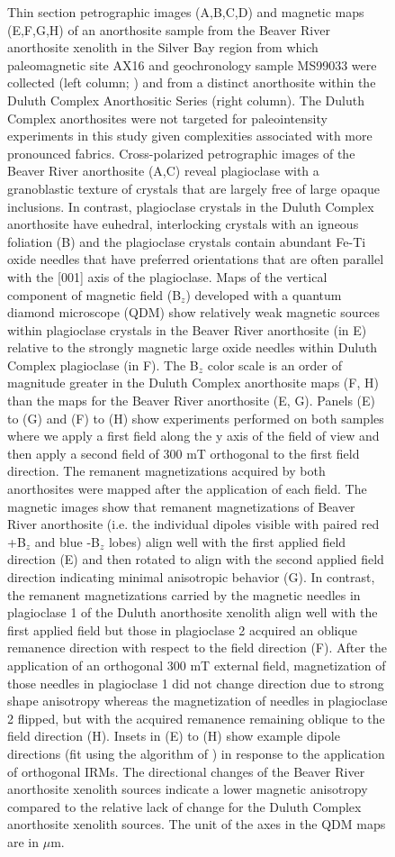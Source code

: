\documentclass[9pt,twocolumn,twoside,lineno]{pnas-new}
\begin{document}
\begin{figure}
\caption{\footnotesize{Thin section petrographic images (A,B,C,D) and magnetic maps (E,F,G,H) of an anorthosite sample from the Beaver River anorthosite xenolith in the Silver Bay region from which paleomagnetic site AX16 and geochronology sample MS99033 were collected (left column;  \citealp{Zhang2021b}) and from a distinct anorthosite within the Duluth Complex Anorthositic Series (right column). The Duluth Complex anorthosites were not targeted for paleointensity experiments in this study given complexities associated with more pronounced fabrics. Cross-polarized petrographic images of the Beaver River anorthosite (A,C) reveal plagioclase with a granoblastic texture of crystals that are largely free of large opaque inclusions. In contrast, plagioclase crystals in the Duluth Complex anorthosite have euhedral, interlocking crystals with an igneous foliation (B) and the plagioclase crystals contain abundant Fe-Ti oxide needles that have preferred orientations that are often parallel with the [001] axis of the plagioclase. Maps of the vertical component of magnetic field (B$_z$) developed with a quantum diamond microscope (QDM) show relatively weak magnetic sources within plagioclase crystals in the Beaver River anorthosite (in E) relative to the strongly magnetic large oxide needles within Duluth Complex plagioclase (in F). The B$_z$ color scale is an order of magnitude greater in the Duluth Complex anorthosite maps (F, H) than the maps for the Beaver River anorthosite (E, G). Panels (E) to (G) and (F) to (H) show experiments performed on both samples where we apply a first field along the y axis of the field of view and then apply a second field of 300 mT orthogonal to the first field direction. The remanent magnetizations acquired by both anorthosites were mapped after the application of each field. The magnetic images show that remanent magnetizations of Beaver River anorthosite (i.e. the individual dipoles visible with paired red +B$_z$ and blue -B$_z$ lobes) align well with the first applied field direction (E) and then rotated to align with the second applied field direction indicating minimal anisotropic behavior (G). In contrast, the remanent magnetizations carried by the magnetic needles in plagioclase 1 of the Duluth anorthosite xenolith align well with the first applied field but those in plagioclase 2 acquired an oblique remanence direction with respect to the field direction (F). After the application of an orthogonal 300 mT external field, magnetization of those needles in plagioclase 1 did not change direction due to strong shape anisotropy whereas the magnetization of needles in plagioclase 2 flipped, but with the acquired remanence remaining oblique to the field direction (H). Insets in (E) to (H) show example dipole directions (fit using the algorithm of \cite{Lima2016a}) in response to the application of orthogonal IRMs. The directional changes of the Beaver River anorthosite xenolith sources indicate a lower magnetic anisotropy compared to the relative lack of change for the Duluth Complex anorthosite xenolith sources. The unit of the axes in the QDM maps are in $\mu$m.}}
\label{fig:Petro_QDM}
\end{figure}
\end{document}
